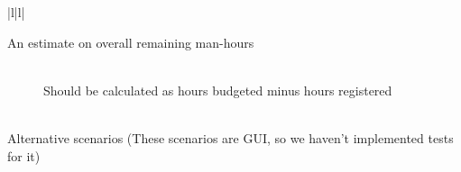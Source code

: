 \begin{table}[H]
\begin{tabular}{|l|l|}
{{\begin{enumerate}
\begin{description}
          \item[An estimate on overall remaining man-hours]\hfill \\
            {Should be calculated as hours budgeted minus hours registered}
          \end{description}
        \end{enumerate}
      }}
    \\ \hline {} {
      Alternative scenarios (These scenarios are GUI, so we haven't implemented tests for it)}
    \\ \hline {}
    \\ \hline
  \end{tabular}
\end{table}
